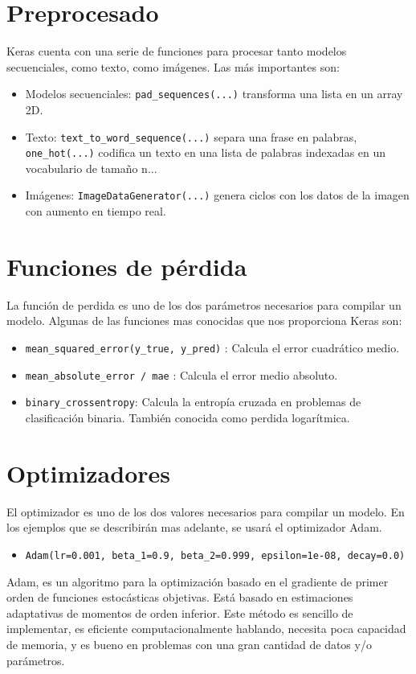 \section{Preprocesado}
Keras cuenta con una serie de funciones para procesar tanto modelos secuenciales, como texto, como imágenes. Las más importantes son:
\begin{itemize}
\item Modelos secuenciales: \lstinline{pad_sequences(...)} transforma una lista en un array 2D.
\item Texto: \lstinline{text_to_word_sequence(...)} separa una frase en palabras, \lstinline{one_hot(...)} codifica un texto en una lista de palabras indexadas en un vocabulario de tamaño n...
\item Imágenes: \lstinline{ImageDataGenerator(...)} genera ciclos con los datos de la imagen con aumento en tiempo real.
\end{itemize}
\section{Funciones de pérdida}
La función de perdida es uno de los dos parámetros necesarios para compilar un modelo. Algunas de las funciones mas conocidas que nos proporciona Keras son:
\begin{itemize}[noitemsep]
\item \lstinline{mean_squared_error(y_true, y_pred)} : Calcula el error cuadrático medio.
\item \lstinline{mean_absolute_error / mae} : Calcula el error medio absoluto.
\item \lstinline{binary_crossentropy}: Calcula la entropía cruzada en problemas de clasificación binaria. También conocida como perdida logarítmica.
\end{itemize}
\section{Optimizadores}
El optimizador es uno de los dos valores necesarios para compilar un modelo. En los ejemplos que se describirán mas adelante, se usará el optimizador Adam.
\begin{itemize}
\item \lstinline{Adam(lr=0.001, beta_1=0.9, beta_2=0.999, epsilon=1e-08, decay=0.0)}
\end{itemize}
Adam, es un algoritmo para la optimización basado en el gradiente de primer orden de funciones estocásticas objetivas. Está basado en estimaciones adaptativas de momentos de orden inferior. Este método es sencillo de implementar, es eficiente computacionalmente hablando, necesita poca capacidad de memoria, y es bueno en problemas con una gran cantidad de datos y/o parámetros.
